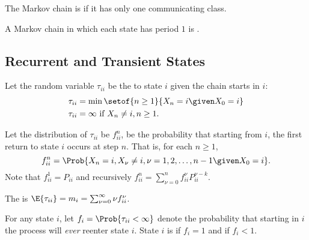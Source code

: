 \documentclass[12pt]{article}
\begin{document}
\begin{definition}
    The Markov chain is  if it has only one
    communicating class.
\end{definition}

\begin{definition}
    A Markov chain in which each state has period \( 1 \) is .
\end{definition}

\subsection*{Recurrent and Transient States}

\begin{definition}
    Let the random variable \( \tau_{ii} \) be the  to
    state \( i \) given the chain starts in \( i \):
    \begin{align*}
        \tau_{ii} &= \min\setof{n \ge 1}{X_n = i \given X_0 = i} \\
        \tau_{ii} &= \infty \text{ if } X_n \ne i, n \ge 1.
    \end{align*}
\end{definition}

\begin{definition}
    Let the distribution of \( \tau_{ii} \) be \( f^n_{ii} \), be the
    probability that starting from \( i \), the first return to state \(
    i \) occurs at step \( n \).  That is, for each \( n \ge 1 \),
    \[
        f^n_{ii} = \Prob{X_n = i, X_\nu \ne i, \nu =1,2,\dots,n-1 \given
        X_0 = i}.
    \] Note that \( f^1_{ii} = P_{ii} \) and recursively \( f^n_{ii} =
    \sum_{\nu=0}^n f^{\nu}_{ii} P^{\nu-k}_{ii} \).
\end{definition}

\begin{definition}
    The  is \( \E{\tau_{ii}} = m_i = \sum_{\nu=0}^
    {\infty} \nu f^\nu_{ii} \).
\end{definition}

\begin{definition}
    For any state \( i \), let \( f_i = \Prob{\tau_{ii} < \infty} \)
    denote the probability that starting in \( i \) the process will
    \emph{ever} reenter state \( i \). State \( i \) is 
    if \( f_i = 1 \) and  if \( f_{i} < 1 \).
\end{definition}
\end{document}
